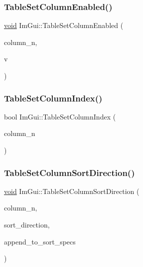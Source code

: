 \mbox{\label{namespaceImGui_a8e40d2b7a1cdee9d210c7de4cf577f7f}} 
\subsubsection{\texorpdfstring{Table\+Set\+Column\+Enabled()}{TableSetColumnEnabled()}}
{\footnotesize\ttfamily \hyperlink{imgui__impl__opengl3__loader_8h_ac668e7cffd9e2e9cfee428b9b2f34fa7}{void} Im\+Gui\+::\+Table\+Set\+Column\+Enabled (\begin{DoxyParamCaption}\item[{int}]{column\+\_\+n,  }\item[{bool}]{v }\end{DoxyParamCaption})}

\mbox{\label{namespaceImGui_adfbeb33991944035737d413379ae8b1c}} 
\subsubsection{\texorpdfstring{Table\+Set\+Column\+Index()}{TableSetColumnIndex()}}
{\footnotesize\ttfamily bool Im\+Gui\+::\+Table\+Set\+Column\+Index (\begin{DoxyParamCaption}\item[{int}]{column\+\_\+n }\end{DoxyParamCaption})}

\mbox{\label{namespaceImGui_a5db8b6e07ea254b0a63e064a64847b99}} 
\subsubsection{\texorpdfstring{Table\+Set\+Column\+Sort\+Direction()}{TableSetColumnSortDirection()}}
{\footnotesize\ttfamily \hyperlink{imgui__impl__opengl3__loader_8h_ac668e7cffd9e2e9cfee428b9b2f34fa7}{void} Im\+Gui\+::\+Table\+Set\+Column\+Sort\+Direction (\begin{DoxyParamCaption}\item[{int}]{column\+\_\+n,  }\item[{Im\+Gui\+Sort\+Direction}]{sort\+\_\+direction,  }\item[{bool}]{append\+\_\+to\+\_\+sort\+\_\+specs }\end{DoxyParamCaption})}

